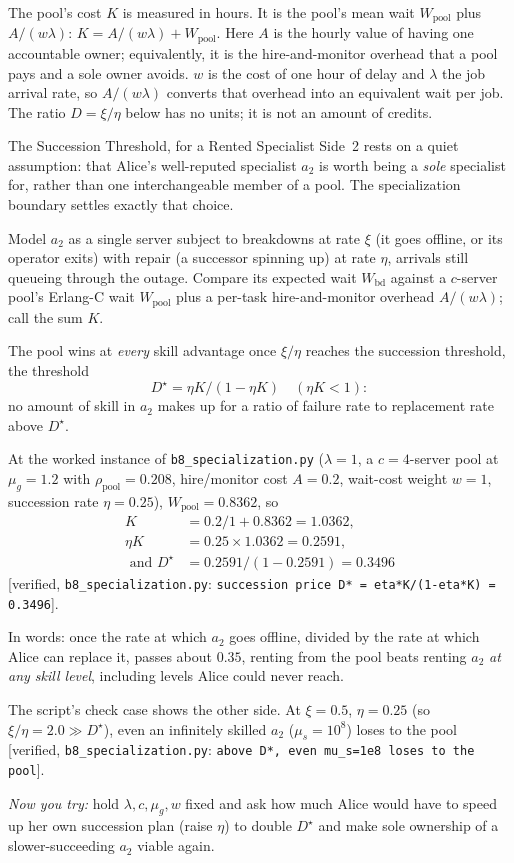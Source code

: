 \documentclass[11pt,a4paper]{article}
\theoremstyle{definition}
\theoremstyle{definition}
\theoremstyle{remark}
\begin{document}
The pool's cost $K$ is measured in hours. It is the pool's mean wait
$W_{\mathrm{pool}}$ plus $A/(w\lambda)$: $K=A/(w\lambda)+W_{\mathrm{pool}}$.
Here $A$ is the hourly value of having one accountable owner; equivalently, it
is the hire-and-monitor overhead that a pool pays and a sole owner avoids.
$w$ is the cost of one hour of delay and $\lambda$ the job arrival rate, so
$A/(w\lambda)$ converts that overhead into an equivalent wait per job. The
ratio $D=\xi/\eta$ below has no units; it is not an amount of credits.
\begin{pdexample}{The Succession Threshold, for a Rented Specialist}
\setlength{\parskip}{4pt plus 1pt}
Side~2 rests on a quiet assumption: that Alice's well-reputed specialist $a_2$ is
worth being a \emph{sole} specialist for, rather than one interchangeable member
of a pool. The specialization boundary settles exactly that choice.

Model
$a_2$ as a single server subject to breakdowns at rate $\xi$ (it goes offline, or
its operator exits) with repair (a successor spinning up) at rate $\eta$,
arrivals still queueing through the outage. Compare its expected wait
$W_{\mathrm{bd}}$ against a $c$-server pool's \mbox{Erlang-C} wait $W_{\mathrm{pool}}$
plus a per-task hire-and-monitor overhead $A/(w\lambda)$; call the sum $K$.

The
pool wins at \emph{every} skill advantage once $\xi/\eta$ reaches the
succession threshold, the threshold \[
D^\star=\eta K/(1-\eta K)\quad(\eta K<1):
\] no amount of skill in $a_2$ makes up for a ratio of failure rate to
replacement rate above $D^\star$.

At the worked instance of \texttt{b8\_specialization.py}
($\lambda=1$, a $c{=}4$-server pool at $\mu_g=1.2$ with
$\rho_{\mathrm{pool}}=0.208$, hire/monitor cost $A=0.2$, wait-cost weight $w=1$, succession
rate $\eta=0.25$), $W_{\mathrm{pool}}=0.8362$, so \[
\begin{aligned}
K &=0.2/1+0.8362=1.0362,\\
\eta K &=0.25\times1.0362=0.2591,\\
\text{ and }D^\star &=0.2591/(1-0.2591)=0.3496
\end{aligned}
\]
[verified, \texttt{b8\_specialization.py}: \texttt{succession price D* =
eta*K/(1-eta*K) = 0.3496}].

In words: once the rate at which $a_2$ goes offline, divided by the rate at
which Alice can replace it, passes about $0.35$, renting from the pool beats
renting $a_2$ \emph{at any skill level}, including levels Alice could never
reach.

The script's check case shows the other side. At $\xi=0.5$,
$\eta=0.25$ (so $\xi/\eta=2.0\gg D^\star$), even an infinitely skilled $a_2$
($\mu_s=10^8$) loses to the pool [verified, \texttt{b8\_specialization.py}:
\texttt{above D*, even mu\_s=1e8 loses to the pool}].

\emph{Now you try:} hold
$\lambda,c,\mu_g,w$ fixed and ask how much Alice would have to speed up her own
succession plan (raise $\eta$) to double $D^\star$ and make sole ownership
of a slower-succeeding $a_2$ viable again.
\end{pdexample}
\end{document}
